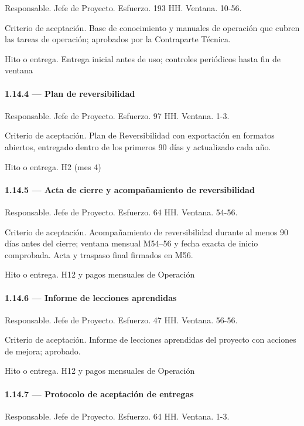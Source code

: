 \documentclass[11pt]{article}
\begin{document}
Responsable. Jefe de Proyecto. Esfuerzo. 193 HH. Ventana. 10-56.

Criterio de aceptación. Base de conocimiento y manuales de operación que cubren las tareas de operación; aprobados por la Contraparte Técnica.

Hito o entrega. Entrega inicial antes de uso; controles periódicos hasta fin de ventana

\paragraph{1.14.4 — Plan de reversibilidad}

Responsable. Jefe de Proyecto. Esfuerzo. 97 HH. Ventana. 1-3.

Criterio de aceptación. Plan de Reversibilidad con exportación en formatos abiertos, entregado dentro de los primeros 90 días y actualizado cada año.

Hito o entrega. H2 (mes 4)

\paragraph{1.14.5 — Acta de cierre y acompañamiento de reversibilidad}

Responsable. Jefe de Proyecto. Esfuerzo. 64 HH. Ventana. 54-56.

Criterio de aceptación. Acompañamiento de reversibilidad durante al menos 90 días antes del cierre; ventana mensual M54–56 y fecha exacta de inicio comprobada. Acta y traspaso final firmados en M56.

Hito o entrega. H12 y pagos mensuales de Operación

\paragraph{1.14.6 — Informe de lecciones aprendidas}

Responsable. Jefe de Proyecto. Esfuerzo. 47 HH. Ventana. 56-56.

Criterio de aceptación. Informe de lecciones aprendidas del proyecto con acciones de mejora; aprobado.

Hito o entrega. H12 y pagos mensuales de Operación

\paragraph{1.14.7 — Protocolo de aceptación de entregas}

Responsable. Jefe de Proyecto. Esfuerzo. 64 HH. Ventana. 1-3.
\end{document}
